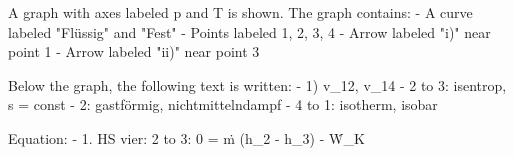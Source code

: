 A graph with axes labeled p and T is shown. The graph contains:
- A curve labeled "Flüssig" and "Fest"
- Points labeled 1, 2, 3, 4
- Arrow labeled "i)" near point 1
- Arrow labeled "ii)" near point 3

Below the graph, the following text is written:
- 1) v_12, v_14
- 2 to 3: isentrop, s = const
- 2: gastförmig, nichtmittelndampf
- 4 to 1: isotherm, isobar

Equation:
- 1. HS vier: 2 to 3: 0 = ṁ (h_2 - h_3) - Ẇ_K